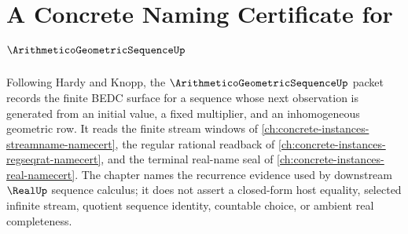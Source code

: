 \chapter{A Concrete Naming Certificate for $\ArithmeticoGeometricSequenceUp$}
\label{ch:concrete-instances-arithmetico-geometric-sequence-namecert}

Following Hardy and Knopp, the $\ArithmeticoGeometricSequenceUp$ packet records the finite BEDC surface for a sequence whose next observation is generated from an initial value, a fixed multiplier, and an inhomogeneous geometric row. It reads the finite stream windows of \autoref{ch:concrete-instances-streamname-namecert}, the regular rational readback of \autoref{ch:concrete-instances-regseqrat-namecert}, and the terminal real-name seal of \autoref{ch:concrete-instances-real-namecert}. The chapter names the recurrence evidence used by downstream $\RealUp$ sequence calculus; it does not assert a closed-form host equality, selected infinite stream, quotient sequence identity, countable choice, or ambient real completeness.

